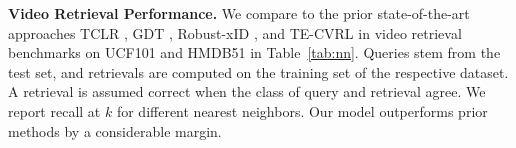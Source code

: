 \documentclass[letterpaper]{article} %
\newcommand{\etal}{\emph{et al.}}
\begin{document}
\noindent \textbf{Video Retrieval Performance.}
We compare to the prior state-of-the-art approaches TCLR \cite{dave2021tclr}, GDT \cite{patrick2020multi}, Robust-xID \cite{morgado2021robust}, and TE-CVRL \cite{jenni2021time} in video retrieval benchmarks on UCF101 and HMDB51 in Table~\ref{tab:nn}.
Queries stem from the test set, and retrievals are computed on the training set of the respective dataset. 
A retrieval is assumed correct when the class of query and retrieval agree. 
We report recall at $k$ for different nearest neighbors.
Our model outperforms prior methods by a considerable margin. 


\end{document}
